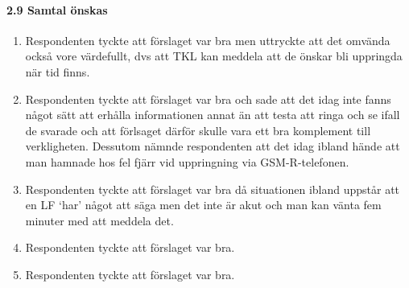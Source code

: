\paragraph{2.9 Samtal önskas}
\begin{enumerate}
    \item Respondenten tyckte att förslaget var bra men uttryckte att det omvända också vore värdefullt, dvs att TKL kan meddela att de önskar bli uppringda när tid finns.
    \item Respondenten tyckte att förslaget var bra och sade att det idag inte fanns något sätt att erhålla informationen annat än att testa att ringa och se ifall de svarade och att förlsaget därför skulle vara ett bra komplement till verkligheten.
    Dessutom nämnde respondenten att det idag ibland hände att man hamnade hos fel fjärr vid uppringning via GSM-R-telefonen.
    \item Respondenten tyckte att förslaget var bra då situationen ibland uppstår att en LF \lq{}har\rq{} något att säga men det inte är akut och man kan vänta fem minuter med att meddela det.
    \item Respondenten tyckte att förslaget var bra.
    \item Respondenten tyckte att förslaget var bra.
\end{enumerate}
\hspace{-12pt}